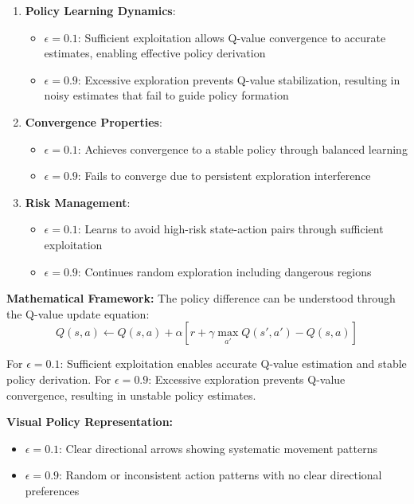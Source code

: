 \documentclass[12pt]{article}
\begin{document}
{{{\begin{enumerate}
    \item \textbf{Policy Learning Dynamics}: 
    \begin{itemize}
        \item $\epsilon = 0.1$: Sufficient exploitation allows Q-value convergence to accurate estimates, enabling effective policy derivation
        \item $\epsilon = 0.9$: Excessive exploration prevents Q-value stabilization, resulting in noisy estimates that fail to guide policy formation
    \end{itemize}
    
    \item \textbf{Convergence Properties}:
    \begin{itemize}
        \item $\epsilon = 0.1$: Achieves convergence to a stable policy through balanced learning
        \item $\epsilon = 0.9$: Fails to converge due to persistent exploration interference
    \end{itemize}
    
    \item \textbf{Risk Management}:
    \begin{itemize}
        \item $\epsilon = 0.1$: Learns to avoid high-risk state-action pairs through sufficient exploitation
        \item $\epsilon = 0.9$: Continues random exploration including dangerous regions
    \end{itemize}
\end{enumerate}

\textbf{Mathematical Framework:}
The policy difference can be understood through the Q-value update equation:
$$Q(s,a) \leftarrow Q(s,a) + \alpha[r + \gamma \max_{a'} Q(s',a') - Q(s,a)]$$

For $\epsilon = 0.1$: Sufficient exploitation enables accurate Q-value estimation and stable policy derivation.
For $\epsilon = 0.9$: Excessive exploration prevents Q-value convergence, resulting in unstable policy estimates.

\textbf{Visual Policy Representation:}
\begin{itemize}
    \item \textbf{$\epsilon = 0.1$}: Clear directional arrows showing systematic movement patterns
    \item \textbf{$\epsilon = 0.9$}: Random or inconsistent action patterns with no clear directional preferences
\end{itemize}

}}}
\end{document}
